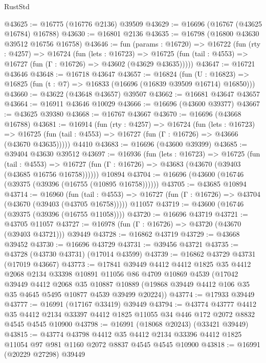 \begin{lexlean}{RustStd}
\begin{coremodule}
@43625 := @16775 (@16776 @2136) @39509
@43629 := @16696 (@16767 (@43625 @16784) @16788)
@43630 := @16801 @2136
@43635 := @16798 (@16800 @43630 @39512 @16756 @16758)
@43646 := fun (params : @16720) =>
  @16722
    (fun (rty : @4257) =>
    @16724
      (fun (lets : @16723) =>
      @16725 (fun (tail : @4553) => @16727 (fun (Γ : @16726) => @43602 (@43629 @43635)))))
@43647 := @16721 @43646
@43648 := @16718 @43647
@43657 := @16824
    (fun (U : @16823) => @16825 (fun (t : @7) => @16833 (@16696 (@16839 @39509 @16714) @16850)))
@43660 := @43622 (@43648 @43657) @39507
@43662 := @16681 @43647 @43657
@43664 := @16911 @43646 @10029
@43666 := @16696 (@43600 @39377)
@43667 := @43625 @39380
@43668 := @16767 @43667
@43670 := @16696 (@43668 @16788)
@43681 := @16914
    (fun (rty : @4257) =>
    @16724
      (fun (lets : @16723) =>
      @16725 (fun (tail : @4553) => @16727 (fun (Γ : @16726) => @43666 (@43670 @43635)))))
    @4410
@43683 := @16696 (@43600 @39399)
@43685 := @39404 @43630 @39512
@43697 := @16936
    (fun (lets : @16723) =>
    @16725
      (fun (tail : @4553) =>
      @16727 (fun (Γ : @16726) => @43683 (@43670 (@39403 (@43685 @16756 @16758))))))
    @10894
@43704 := @16696 (@43600 (@16746 (@39375 (@39396 (@16755 (@10895 @16758))))))
@43705 := @43685 @10894
@43714 := @16960
    (fun (tail : @4553) => @16727 (fun (Γ : @16726) => @43704 (@43670 (@39403 (@43705 @16758)))))
    @11057
@43719 := @43600 (@16746 (@39375 (@39396 (@16755 @11058))))
@43720 := @16696 @43719
@43721 := @43705 @11057
@43727 := @16978 (fun (Γ : @16726) => @43720 (@43670 (@39403 @43721))) @39449
@43728 := @16862 @43719
@43729 := @43668 @39452
@43730 := @16696 @43729
@43731 := @39456 @43721
@43735 := @43728 (@43730 @43731) (@17014 @43599)
@43739 := @16862 @43729 @43731 (@17019 @43667)
@43773 := @17841
    @39449
    @4412
    @4412
    @1825
    @35
    @4412
    @2068
    @2134
    @33398
    @10891
    @11056
    @86
    @4709
    @10869
    @4539
    (@17042
      @39449
      @4412
      @2068
      @35
      @10887
      @10889
      (@19868 @39449 @4412 @106 @35 @35 @4645 @5495 @10877 @4539 @39499 @20224))
@43774 := @17933 @39449
@43777 := @16991 (@17167 @33419) @39449
@43794 := @43774
    @43777
    @4412
    @35
    @4412
    @2134
    @33397
    @4412
    @1825
    @11055
    @34
    @446
    @172
    @2072
    @8832
    @4545
    @4545
    @10900
@43798 := @16991 (@18068 @20243) (@33421 @39449)
@43815 := @43774
    @43798
    @4412
    @35
    @4412
    @2134
    @33396
    @4412
    @1825
    @11054
    @97
    @981
    @1160
    @2072
    @8837
    @4545
    @4545
    @10900
@43818 := @16991 (@20229 @27298) @39449

\end{coremodule}
\end{lexlean}
